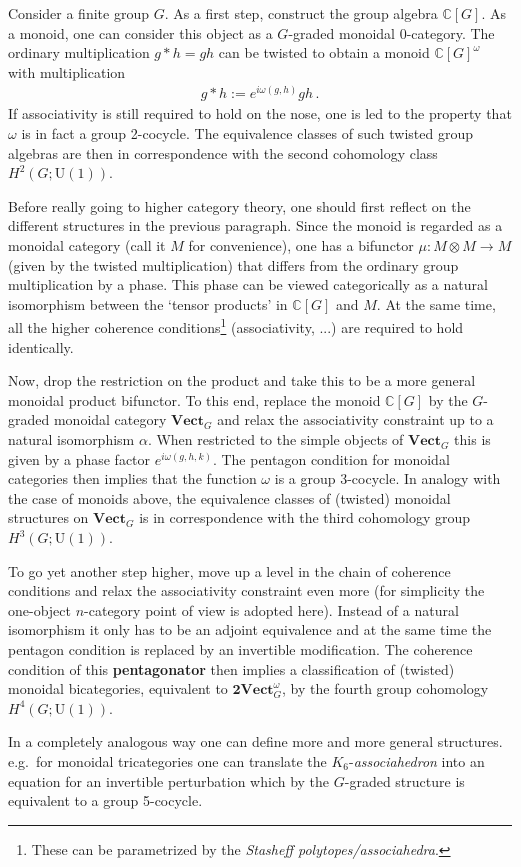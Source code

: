     Consider a finite group $G$. As a first step, construct the group algebra $\mathbb{C}[G]$. As a monoid, one can consider this object as a $G$-graded monoidal 0-category. The ordinary multiplication $g\ast h=gh$ can be twisted to obtain a monoid $\mathbb{C}[G]^\omega$ with multiplication
    \begin{gather}
        g\ast h := e^{i\omega(g,h)}gh\,.
    \end{gather}
    If associativity is still required to hold on the nose, one is led to the property that $\omega$ is in fact a group 2-cocycle. The equivalence classes of such twisted group algebras are then in correspondence with the second cohomology class $H^2(G;\mathrm{U}(1))$.

    Before really going to higher category theory, one should first reflect on the different structures in the previous paragraph. Since the monoid is regarded as a monoidal category (call it $M$ for convenience), one has a bifunctor $\mu:M\otimes M\rightarrow M$ (given by the twisted multiplication) that differs from the ordinary group multiplication by a phase. This phase can be viewed categorically as a natural isomorphism between the `tensor products' in $\mathbb{C}[G]$ and $M$. At the same time, all the higher coherence conditions\footnote{These can be parametrized by the \textit{Stasheff polytopes/associahedra}.} (associativity, ...) are required to hold identically.

    Now, drop the restriction on the product and take this to be a more general monoidal product bifunctor. To this end, replace the monoid $\mathbb{C}[G]$ by the $G$-graded monoidal category $\mathbf{Vect}_G$ and relax the associativity constraint up to a natural isomorphism $\alpha$. When restricted to the simple objects of $\mathbf{Vect}_G$ this is given by a phase factor $e^{i\omega(g,h,k)}$. The pentagon condition for monoidal categories then implies that the function $\omega$ is a group 3-cocycle. In analogy with the case of monoids above, the equivalence classes of (twisted) monoidal structures on $\mathbf{Vect}_G$ is in correspondence with the third cohomology group $H^3(G;\mathrm{U}(1))$.

    To go yet another step higher, move up a level in the chain of coherence conditions and relax the associativity constraint even more (for simplicity the one-object $n$-category point of view is adopted here). Instead of a natural isomorphism it only has to be an adjoint equivalence and at the same time the pentagon condition is replaced by an invertible modification. The coherence condition of this \textbf{pentagonator} then implies a classification of (twisted) monoidal bicategories, equivalent to $\mathbf{2Vect}_G^\omega$, by the fourth group cohomology $H^4(G;\mathrm{U}(1))$.

    In a completely analogous way one can define more and more general structures. e.g.~for monoidal tricategories one can translate the $K_6$-\textit{associahedron} into an equation for an invertible perturbation which by the $G$-graded structure is equivalent to a group 5-cocycle.

